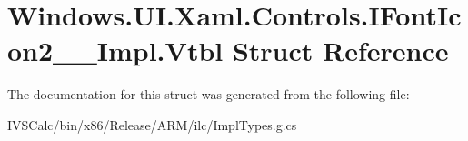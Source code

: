 \hypertarget{struct_windows_1_1_u_i_1_1_xaml_1_1_controls_1_1_i_font_icon2_____impl_1_1_vtbl}{}\section{Windows.\+U\+I.\+Xaml.\+Controls.\+I\+Font\+Icon2\+\_\+\+\_\+\+Impl.\+Vtbl Struct Reference}
\label{struct_windows_1_1_u_i_1_1_xaml_1_1_controls_1_1_i_font_icon2_____impl_1_1_vtbl}


The documentation for this struct was generated from the following file\+:\begin{DoxyCompactItemize}
\item 
I\+V\+S\+Calc/bin/x86/\+Release/\+A\+R\+M/ilc/Impl\+Types.\+g.\+cs\end{DoxyCompactItemize}
